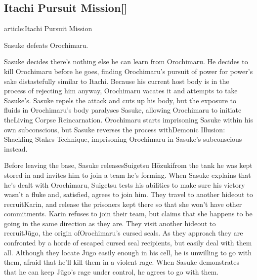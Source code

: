 \documentclass[a4paper,12pt]{article}
\begin{document}
\subsection*{Itachi Pursuit Mission[]}\n\nMain article:Itachi Pursuit Mission\\ \par \vspace{0.5cm}

Sasuke defeats Orochimaru.\\ \par \vspace{0.5cm}

Sasuke decides there's nothing else he can learn from Orochimaru. He decides to kill Orochimaru before he goes, finding Orochimaru's pursuit of power for power's sake distastefully similar to Itachi. Because his current host body is in the process of rejecting him anyway, Orochimaru vacates it and attempts to take Sasuke's. Sasuke repels the attack and cuts up his body, but the exposure to fluids in Orochimaru's body paralyses Sasuke, allowing Orochimaru to initiate theLiving Corpse Reincarnation. Orochimaru starts imprisoning Sasuke within his own subconscious, but Sasuke reverses the process withDemonic Illusion: Shackling Stakes Technique, imprisoning Orochimaru in Sasuke's subconscious instead.\\ \par \vspace{0.5cm}

Before leaving the base, Sasuke releasesSuigetsu Hōzukifrom the tank he was kept stored in and invites him to join a team he's forming. When Sasuke explains that he's dealt with Orochimaru, Suigetsu tests his abilities to make sure his victory wasn't a fluke and, satisfied, agrees to join him. They travel to another hideout to recruitKarin, and release the prisoners kept there so that she won't have other commitments. Karin refuses to join their team, but claims that she happens to be going in the same direction as they are. They visit another hideout to recruitJūgo, the origin ofOrochimaru's cursed seals. As they approach they are confronted by a horde of escaped cursed seal recipients, but easily deal with them all. Although they locate Jūgo easily enough in his cell, he is unwilling to go with them, afraid that he'll kill them in a violent rage. When Sasuke demonstrates that he can keep Jūgo's rage under control, he agrees to go with them.\\ \par \vspace{0.5cm}
\end{document}
